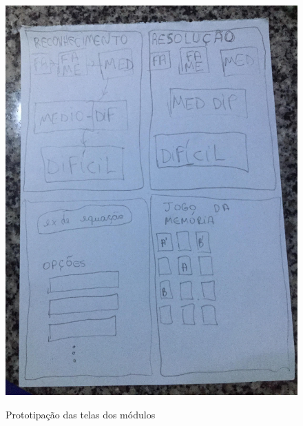 \begin{figure}[H]
\centering
\caption{Prototipação das telas dos módulos}
\includegraphics[scale=0.4]{figuras/prot2.jpg}
\label{prot2}
\end{figure}


